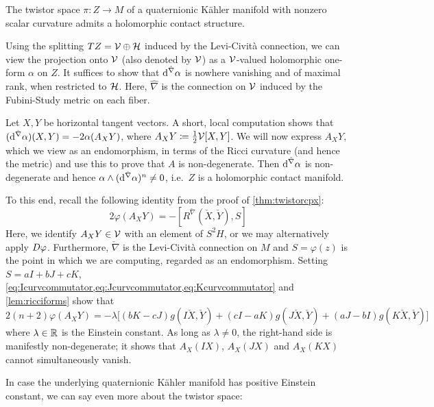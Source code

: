 \begin{thm}\label{thm:twistorctc}
	The twistor space $\pi:Z\to M$ of a quaternionic K\"ahler manifold with nonzero scalar curvature admits a holomorphic contact structure.
\end{thm}
\begin{myproof}
	Using the splitting $TZ=\mathcal{V}\oplus \mathcal{H}$ induced by the Levi-Civit\`a connection, we can view the projection onto $\mathcal{V}$ (also denoted by $\mathcal{V}$) as a $\mathcal{V}$-valued holomorphic one-form $\alpha$ on $Z$. It suffices to show that $\mathrm{d}^{\hat\nabla}\alpha$ is nowhere vanishing and of maximal rank, when restricted to $\mathcal{H}$. Here, $\hat\nabla$ is the connection on $\mathcal{V}$ induced by the Fubini-Study metric on each fiber.
	
	Let $X,Y$ be horizontal tangent vectors. A short, local computation shows that $(\mathrm{d}^{\hat\nabla}\alpha)(X,Y)=-2\alpha(A_XY)$, where $A_XY\coloneqq\frac{1}{2}\mathcal{V}[X,Y]$. We will now express $A_X Y$, which we view as an endomorphism, in terms of the Ricci curvature (and hence the metric) and use this to prove that $A$ is non-degenerate. Then $\mathrm{d}^{\hat\nabla}\alpha$ is non-degenerate and hence $\alpha\wedge (\mathrm{d}^{\hat\nabla}\alpha)^n\neq 0$, i.e.~$Z$ is a holomorphic contact manifold.
	
	To this end, recall the following identity from the proof of \cref{thm:twistorcpx}:
	\begin{equation*}
		2\varphi(A_XY)=-[R^{\check\nabla}(\check X,\check Y),S]
	\end{equation*}
	Here, we identify $A_XY\in \mathcal{V}$ with an element of $S^2H$, or we may alternatively apply $D\varphi$. Furthermore, $\check\nabla$ is the Levi-Civit\`a connection on $M$ and $S=\varphi(z)$ is the point in which we are computing, regarded as an endomorphism. Setting $S=aI+bJ+cK$, \cref{eq:Icurvcommutator,eq:Jcurvcommutator,eq:Kcurvcommutator} and \cref{lem:ricciforms} show that
	\begin{equation*}
		2(n+2)\varphi(A_XY)=-\lambda\Big[(bK-cJ)g(I\check X,\check Y)
		+(cI-aK)g(J\check X,\check Y)
		+(aJ-bI)g(K\check X,\check Y)\Big]
	\end{equation*}
	where $\lambda\in\mathbb{R}$ is the Einstein constant. As long as $\lambda\neq 0$, the right-hand side is manifestly non-degenerate; it shows that $A_X(IX)$, $A_X(JX)$ and $A_X(KX)$ cannot simultaneously vanish.
\end{myproof}

In case the underlying quaternionic K\"ahler manifold has positive Einstein constant, we can say even more about the twistor space:


